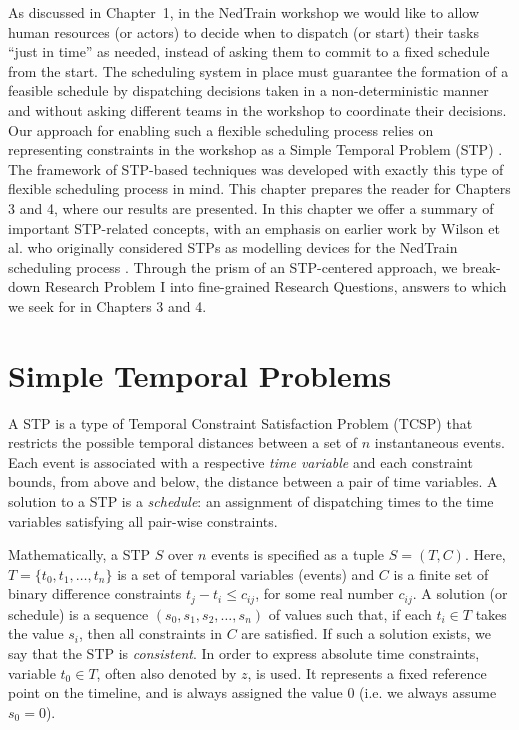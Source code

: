 	As discussed in Chapter~1, in the NedTrain workshop we would like to allow human resources (or actors) 
	to decide when to dispatch (or start) their tasks ``just in time'' as needed, 
	instead of asking them to commit to a fixed schedule from the start.
	The scheduling system in place must guarantee the formation of a feasible schedule
	by dispatching decisions taken in a non-deterministic manner and
	without asking different teams in the workshop to coordinate their decisions.
	Our approach for enabling such a flexible scheduling process relies on
	representing constraints in the workshop as a Simple Temporal Problem (STP) \cite{dechter1991}.
	The framework of STP-based techniques was developed with exactly this type of flexible scheduling process in mind.
	This chapter prepares the reader for Chapters 3 and 4, where our results are presented.
	In this chapter we offer a summary of important STP-related concepts,
	with an emphasis on earlier work by Wilson et al. who originally considered STPs as 
	modelling devices for the NedTrain scheduling process \cite{wilson2011efficient, wilson:2014, wilson:2016}.
	Through the prism of an STP-centered approach,
	we break-down Research Problem I into fine-grained Research Questions,
	answers to which we seek for in Chapters 3 and 4.	

\section{Simple Temporal Problems}	

	A STP is a type of Temporal Constraint Satisfaction Problem (TCSP) \cite{dechter1991,ghallab2004} that
	restricts the possible temporal distances between a set of $n$ instantaneous events.
	Each event is associated with a respective \emph{time variable} 
	and each constraint bounds, from above and below, the distance between a pair of time variables.
	A solution to a STP is a \emph{schedule}: an assignment of dispatching times to the time variables satisfying all pair-wise constraints.
	
	Mathematically, a STP $S$ over $n$ events is specified as a tuple $S = (T,C)$.
	Here, $T = \{t_0 , t_1 , \ldots , t_n \}$ is a set of temporal variables (events) 
	and $C$ is a finite set of binary difference constraints $t_j - t_i \leq c_{ij}$, for some real number $c_{ij}$. 
	A solution (or schedule) is a sequence $(s_0, s_1 , s_2 , \ldots, s_n)$ of values such that, if each $t_i \in T$ takes the value $s_i$,
	then all constraints in $C$ are satisfied. 
	If such a solution exists, we say that the STP is \emph{consistent}. 
	In order to express absolute time constraints, variable $t_0 \in T$, often also denoted by $z$, is used. 
	It represents a fixed reference point on the timeline, and is always assigned the value $0$ (i.e. we always assume $s_0 = 0$).

